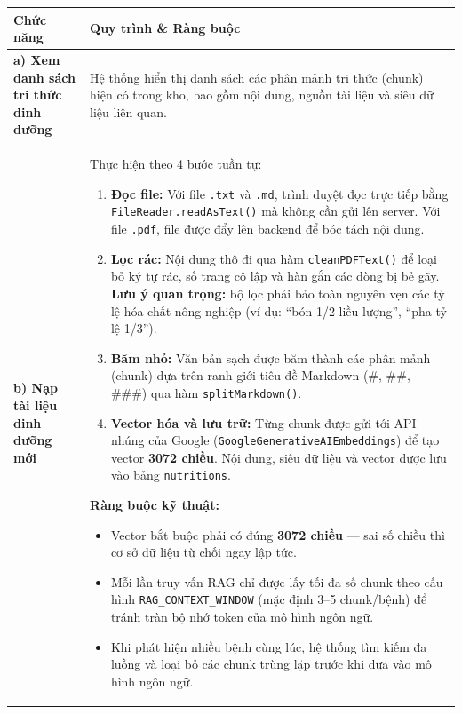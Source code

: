 \documentclass[12pt,a4paper]{article}
\begin{document}
\begin{longtable}{|
        >{\raggedright\arraybackslash}p{2.8cm}|
        >{\raggedright\arraybackslash}p{12cm}|}
    \hline
    \rowcolor{headerblue}
    \textbf{Chức năng}                            & \textbf{Quy trình \& Ràng buộc}                                                           \\
    \hline
    \endhead
    \textbf{a) Xem danh sách tri thức dinh dưỡng} &
    Hệ thống hiển thị danh sách các phân mảnh tri thức (chunk) hiện có trong kho, bao gồm nội dung, nguồn tài liệu và siêu dữ liệu liên quan. \\
    \hline
    \textbf{b) Nạp tài liệu dinh dưỡng mới}       &
    Thực hiện theo 4 bước tuần tự:
    \begin{enumerate}[leftmargin=*,topsep=2pt,itemsep=1pt]
        \item \textbf{Đọc file:} Với file \texttt{.txt} và \texttt{.md}, trình duyệt đọc trực tiếp bằng \texttt{FileReader.readAsText()} mà không cần gửi lên server. Với file \texttt{.pdf}, file được đẩy lên backend để bóc tách nội dung.
        \item \textbf{Lọc rác:} Nội dung thô đi qua hàm \texttt{cleanPDFText()} để loại bỏ ký tự rác, số trang cô lập và hàn gắn các dòng bị bẻ gãy. \textbf{Lưu ý quan trọng:} bộ lọc phải bảo toàn nguyên vẹn các tỷ lệ hóa chất nông nghiệp (ví dụ: ``bón 1/2 liều lượng'', ``pha tỷ lệ 1/3'').
        \item \textbf{Băm nhỏ:} Văn bản sạch được băm thành các phân mảnh (chunk) dựa trên ranh giới tiêu đề Markdown (\#, \#\#, \#\#\#) qua hàm \texttt{splitMarkdown()}.
        \item \textbf{Vector hóa và lưu trữ:} Từng chunk được gửi tới API nhúng của Google (\texttt{GoogleGenerativeAIEmbeddings}) để tạo vector \textbf{3072 chiều}. Nội dung, siêu dữ liệu và vector được lưu vào bảng \texttt{nutritions}.
    \end{enumerate}
    \textbf{Ràng buộc kỹ thuật:}
    \begin{itemize}[leftmargin=*,topsep=2pt,itemsep=1pt]
        \item Vector bắt buộc phải có đúng \textbf{3072 chiều} --- sai số chiều thì cơ sở dữ liệu từ chối ngay lập tức.
        \item Mỗi lần truy vấn RAG chỉ được lấy tối đa số chunk theo cấu hình \texttt{RAG\_CONTEXT\_WINDOW} (mặc định 3--5 chunk/bệnh) để tránh tràn bộ nhớ token của mô hình ngôn ngữ.
        \item Khi phát hiện nhiều bệnh cùng lúc, hệ thống tìm kiếm đa luồng và loại bỏ các chunk trùng lặp trước khi đưa vào mô hình ngôn ngữ.

\end{itemize}
\end{longtable}
\end{document}
